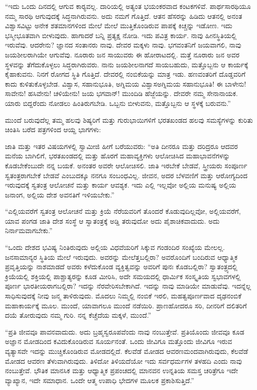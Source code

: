  “ಇದು ಒಂದು ದಿನದಲ್ಲಿ ಆಗುವ ಕಾರ‍್ಯವಲ್ಲ. ದಾರಿಯಲ್ಲಿ ಅತ್ಯಂತ ಭಯಂಕರವಾದ ಕಂಟಕಗಳಿವೆ. ಪಾರ್ಥಸಾರಥಿಯೂ ನಮ್ಮ ಸಾರಥಿ ಆಗುವುದಕ್ಕೆ ಸಿದ್ಧನಾಗಿರುವನು. ಅದು ನಮಗೆ ಗೊತ್ತಿದೆ. ಆತನ ಹೆಸರನ್ನು ಹಿಡಿದು ಆತನಲ್ಲಿ ಅನಂತ ವಿಶ್ವಾಸವಿಟ್ಟು ಅನೇಕ ಶತಮಾನಗಳಿಂದ ಮೇಲೆ ಮೇಲೆ ಮುತ್ತಿಕೊಂಡಿರುವ ಪಾಪಕ್ಕೆ ಕಿಚ್ಚನ್ನು ಇಡೋಣ. ಇದು ಭಸ್ಮೀಭೂತವಾಗಿ ಬೀಳುವುದು. ಹಾಗಾದರೆ ಬನ್ನಿ ಪ್ರತ್ಯಕ್ಷ ನೋಡಿ. ಇದು ಪವಿತ್ರ ಕಾರ್ಯ. ನಾವು ಹೀನಸ್ಥಿತಿಯಲ್ಲಿ ಇರುವೆವು. ಆದರೇನು? ಜ್ಞಾನದ ಸಂತಾನರು ನಾವು. ದೇವರ ಮಕ್ಕಳು ನಾವು. ಭಗವಂತನಿಗೆ ಜಯವಾಗಲಿ, ನಾವು ಜಯಶೀಲರಾಗಿಯೇ ಆಗುವೆವು. ನೂರಾರು ಜನ ಸಾಯುವರು ಈ ಹೋರಾಟದಲ್ಲಿ. ಮತ್ತೆ ನೂರಾರು ಜನ ಅವರ ಸ್ಥಳವನ್ನು ತೆಗೆದುಕೊಳ್ಳಲು ಸಿದ್ಧರಾಗಿರುವರು. ನಾನು ಜಯಶೀಲನಾಗದೆ ಸಾಯಬಹುದು, ಮತ್ತೊಬ್ಬನು ಆ ಕಾರ್ಯಕ್ಕೆ ಕೈಹಾಕುವನು. ನಿನಗೆ ರೋಗದ ಸ್ಥಿತಿ ಗೊತ್ತಿದೆ. ದೇವರಲ್ಲಿ ನಂಬಿಕೆಯನ್ನು ಮಾತ್ರ ಇಡು. ಹಣವಂತರಿಗೆ ದೊಡ್ಡವರಿಗೆ ಕಾದು ಕುಳಿತುಕೊಳ್ಳಬೇಡ. ವಿಶ್ವಾಸ, ಸಹಾನುಭೂತಿ, ಅಗ್ನಿಮಯ ವಿಶ್ವಾಸ\break ಅಗ್ನಿಮಯ ಸಹಾನುಭೂತಿ! ಈ ಬಾಳೇನು! ಸಾವೇನು! ಹಸಿವೇನು! ಚಳಿಯೇನು! ಜಯ ಭಗವಾನ್! ಮುಂದಿಡಿ ಹೆಜ್ಜೆಯನ್ನು. ದೇವರೇ ನಮ್ಮ ಸೇನಾನಾಯಕ. ಯಾರು ಬಿದ್ದರೆಂದು ನೋಡಲು ಹಿಂತಿರುಗಬೇಡಿ. ಒಬ್ಬನು ಬೀಳುವನು, ಮತ್ತೊಬ್ಬನು ಆ ಸ್ಥಳಕ್ಕೆ ಬರುವನು.” 

 ಮುಂದೆ ಬರುವುದೆಲ್ಲ ತಮ್ಮ ಹಲವು ಶಿಷ್ಯರಿಗೆ ಮತ್ತು ಗುರುಭಾಯಿಗಳಿಗೆ ಭರತಖಂಡದ ಹಲವು ಸಮಸ್ಯೆಗಳನ್ನು ಕುರಿತು ಚಿಂತಿಸಿ ಬರೆದ ಪತ್ರಗಳಿಂದ ಆಯ್ದ ಭಾಗಗಳು: 

 ಜಾತಿ ಮತ್ತು ಇತರ ವಿಷಯಗಳಲ್ಲಿ ಸ್ವಾಮೀಜಿ ಹೀಗೆ ಬರೆಯುವರು: “ಅತಿ ದೀನರೂ ಮತ್ತು ದರಿದ್ರರೂ ಆದವರ ಮನೆಯ ಬಾಗಿಲಿಗೆ, ಭರತಖಂಡದಲ್ಲಿ ಮತ್ತು ಹೊರಗೆ ಮಹಾವ್ಯಕ್ತಿಗಳು ಆಲೋಚಿಸಿದ ಮಹಾಭಾವನೆಗಳನ್ನು ಕೊಡಬೇಕೆಂಬುದೇ ನನ್ನ ಬಯಕೆ. ಅನಂತರ ಅವರೇ ಆಲೋಚಿಸಲಿ. ಜಾತಿ ಇರಬೇಕೆ ಬೇಡವೆ, ಸ್ತ್ರೀಯರು ಸಂಪೂರ್ಣ ಸ್ವತಂತ್ರರಾಗಬೇಕೆ ಬೇಡವೆ ಎಂಬುದಕ್ಕೂ ನನಗೂ ಸಂಬಂಧವಿಲ್ಲ. ಜೀವನ, ಅದರ ಬೆಳವಣಿಗೆ ಮತ್ತು ಆರೋಗ್ಯದಿಂದ ಇರುವುದಕ್ಕೆ ಸ್ವತಂತ್ರ ಆಲೋಚನೆ ಮತ್ತು ಕಾರ್ಯ ಆವಶ್ಯಕ. ಇದು ಎಲ್ಲಿ ಇಲ್ಲವೋ ಅಲ್ಲಿಯ ಮನುಷ್ಯ ಅಲ್ಲಿಯ ಜನಾಂಗ, ಅಲ್ಲಿಯ ದೇಶ ಅವನತಿಗೆ ಇಳಿಯಬೇಕು.” 

 “ಎಲ್ಲಿಯವರೆಗೆ ಸ್ವತಂತ್ರ ಆಲೋಚನೆ ಮತ್ತು ಕ್ರಿಯೆ ನೆರೆಯವರಿಗೆ ತೊಂದರೆ ಕೊಡುವುದಿಲ್ಲವೋ‌, ಅಲ್ಲಿಯವರೆಗೆ, ಯಾವ ಪಂಗಡ ಜಾತಿ ದೇಶ ಸಂಸ್ಥೆ ಆ ಸ್ವಾತಂತ್ರಕ್ಕೆ ಅಡ್ಡಿ ತರುವುದೋ ಅದು ಪೈಶಾಚಿಕವಾದುದು. ಅದು ನಿರ್ನಾಮವಾಗಬೇಕು.” 

 “ಒಂದು ದೇಶದ ಭವಿಷ್ಯ ನಿಂತಿರುವುದು ಅಲ್ಲಿಯ ವಿಧವೆಯರಿಗೆ ಸಿಕ್ಕುವ ಗಂಡಂದಿರ ಸಂಖ್ಯೆಯ ಮೇಲಲ್ಲ. ಜನಸಾಮಾನ್ಯರ ಸ್ಥಿತಿಯ ಮೇಲೆ ಇರುವುದು. ಅವರನ್ನು ಮೇಲೆತ್ತಬಲ್ಲಿರಾ? ಅವರೊಂದಿಗೆ ಬಂದಿರುವ ಆಧ್ಯಾತ್ಮಿಕ ಪ್ರವೃತ್ತಿಯನ್ನು ನಾಶಮಾಡದೆ ಅವರು ಕಳೆದುಕೊಂಡ ವ್ಯಕ್ತಿತ್ವವನ್ನು ಅವರಿಗೆ ಪುನಃ ಕೊಡಬಲ್ಲಿರಾ? ಸ್ವಾತಂತ್ರ್ಯದಲ್ಲಿ ಕ್ರಿಯೆಯಲ್ಲಿ ಶಕ್ತಿಯಲ್ಲಿ ಪಾಶ್ಚಾತ್ಯರನ್ನು ಕೂಡ ಮೀರಿಸಿ, ಅದೇ ಸಮಯದಲ್ಲಿ ಧಾರ್ಮಿಕ ಸಂಸ್ಕೃತಿಯ ಸ್ವಭಾವಗಳಲ್ಲಿ ಪೂರ್ಣ ಭಾರತೀಯರಾಗಬಲ್ಲಿರಾ? ಇದನ್ನು ನೆರವೇರಿಸಬೇಕಾಗಿದೆ. ಇದನ್ನು ನಾವು ಮಾಡಿಯೇ ಮಾಡುವೆವು. ಇದನ್ನೆಲ್ಲ ಸಾಧಿಸುವುದಕ್ಕೆ ನೀವು ಜನ್ಮ ತಾಳಿರುವುದು. ಮೊದಲು ನಿಮ್ಮಲ್ಲಿ ನಂಬಿಕೆ ಇರಲಿ, ಮಹತ್ವಪೂರ್ಣವಾದ ದೃಢನಂಬಿಕೆ ಮಹಾಕಾರ್ಯಕ್ಕೆ ಮೂಲ. ಮುಂದೆ, ಯಾವಾಗಲೂ ಮುಂದೆ ನಡೆಯಿರಿ. ಪ್ರಾಣಹೋದರೂ ಸರಿ, ದೀನರಿಗೆ ದಲಿತರಿಗೆ ದಯೆ ತೋರುವುದು ನಮ್ಮ ಗುರಿ. ನನ್ನ ಕೆಚ್ಚೆದೆಯ ಮಕ್ಕಳೆ, ಮುಂದೆ.” 

 “ಪ್ರತಿ ಜೀವವೂ ಪಾವನವಾದುದು. ಅದು ಬ್ರಹ್ಮಸ್ವರೂಪವೆಂದು ನಾವು ನಂಬುತ್ತೇವೆ. ಪ್ರತಿಯೊಂದು ಜೀವವೂ ಕೂಡ ಅಜ್ಞಾನ ಮೋಡದಿಂದ ಕವಿದುಕೊಂಡಿರುವ ಸೂರ್ಯನಂತೆ. ಒಂದು ಜೀವಿಗೂ ಮತ್ತೊಂದು ಜೀವಿಗೂ ಇರುವ ವ್ಯತ್ಯಾಸವೇ ಇದನ್ನು ಮುಚ್ಚಿಕೊಂಡಿರುವ ಮೋಡದಲ್ಲಿದೆ. ಕೆಲವೆಡೆ ಮೋಡದ ಆವರಣ\break ಮಂದವಾಗಿರುವುದು, ಕೆಲವೆಡೆ ಮೋಡದ ಆವರಣ ತೆಳುವಾಗಿರುವುದು. ತಿಳಿದೋ ತಿಳಿಯದೆಯೋ ಇದು ಸರ್ವಧರ್ಮಗಳ ತಳಹದಿ ಎಂದು ನಾವು ನಂಬುತ್ತೇವೆ. ಭೌತಿಕ ಮಾನಸಿಕ ಮತ್ತು ಆಧ್ಯಾತ್ಮಿಕ ಪ್ರಪಂಚದಲ್ಲಿ ಮಾನವನ ಉನ್ನತಿಯ ಸಮಸ್ತ ಚರಿತ್ರೆಗೂ ಇದೇ ವ್ಯಾಖ್ಯಾನ, ಇದೇ ಸಮಾಧಾನ. ಒಂದೇ ಆತ್ಮ ಉಪಾಧಿ ಭೇದಗಳ ಮೂಲಕ ಪ್ರಕಾಶಿಸುತ್ತಿದೆ.” 

